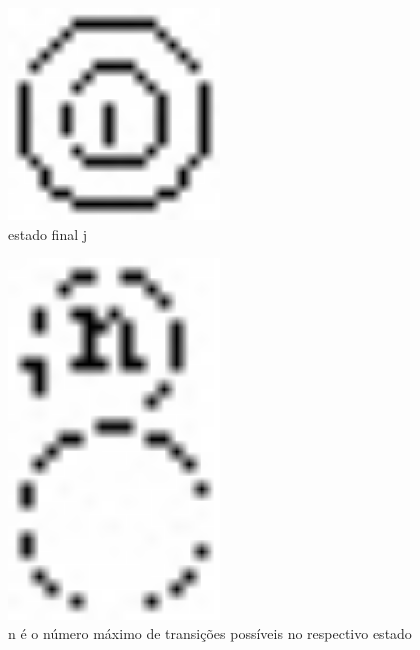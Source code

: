 \documentclass{exam}
\begin{document}
\begin{questions}
\begin{figure}[H]
	\begin{center}
		\includegraphics[width=0.5\textwidth]{CIENCIA_DA_COMPUTACAO_Prova2005-utf8_figuras/fig-0037.jpg}
		\caption{estado final j}
	\end{center}
\end{figure}
 
\begin{figure}[H]
	\begin{center}
		\includegraphics[width=0.5\textwidth]{CIENCIA_DA_COMPUTACAO_Prova2005-utf8_figuras/fig-0038.jpg}
		\caption{n é o número máximo de transições possíveis no respectivo estado}
	\end{center}
\end{figure}


\end{questions}
\end{document}
